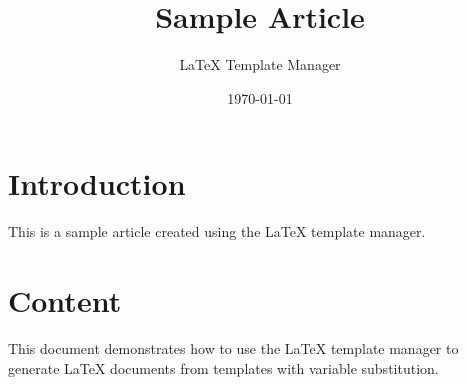 \documentclass{article}
\title{Sample Article}
\author{LaTeX Template Manager}
\date{\today}
\begin{document}
\maketitle

\section{Introduction}
This is a sample article created using the LaTeX template manager.

\section{Content}
This document demonstrates how to use the LaTeX template manager to generate LaTeX documents from templates with variable substitution.
\end{document}
